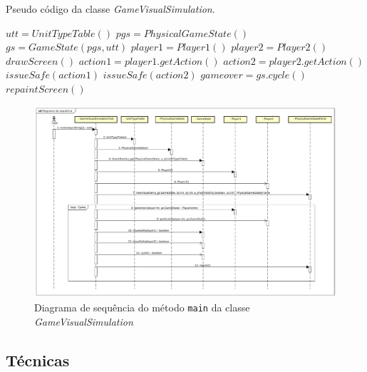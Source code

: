 \begin{algorithm}
	\caption{Pseudo código da classe \textit{GameVisualSimulation}.}
	\label{alg:jogo}
	\begin{algorithmic}[1]		
		\State $utt = UnitTypeTable()$ \label{alg:jogo:instancia}
		\State $pgs = PhysicalGameState()$
		\State $gs = GameState(pgs, utt)$
		\State $player1 = Player1()$
		\State $player2 = Player2()$ \label{alg:jogo:instanciaend}
		\State $drawScreen()$  \label{alg:jogo:desenha}
		 \label{alg:jogo:while}
			\State $action1 = player1.getAction()$ \label{alg:jogo:action1}
			\State $action2 = player2.getAction()$ \label{alg:jogo:action2}
			\State $issueSafe(action1)$ \label{alg:jogo:issue1}
			\State $issueSafe(action2)$ \label{alg:jogo:issue2}
			\State $gameover = gs.cycle()$ \label{alg:jogo:gameover} 
			\State $repaintScreen()$ \label{alg:jogo:repaint}
		\EndWhile
		\EndFunction
	\end{algorithmic}
\end{algorithm}

\begin{figure}[ht]
	\centering
	\includegraphics[width=1\textwidth]{fig/diagramaSequencia.pdf}
	\caption{Diagrama de sequência do método \texttt{main} da classe \textit{GameVisualSimulation}}
	\label{fig:sequencia}
\end{figure}

\subsection{Técnicas} \label{sec:tecn}

